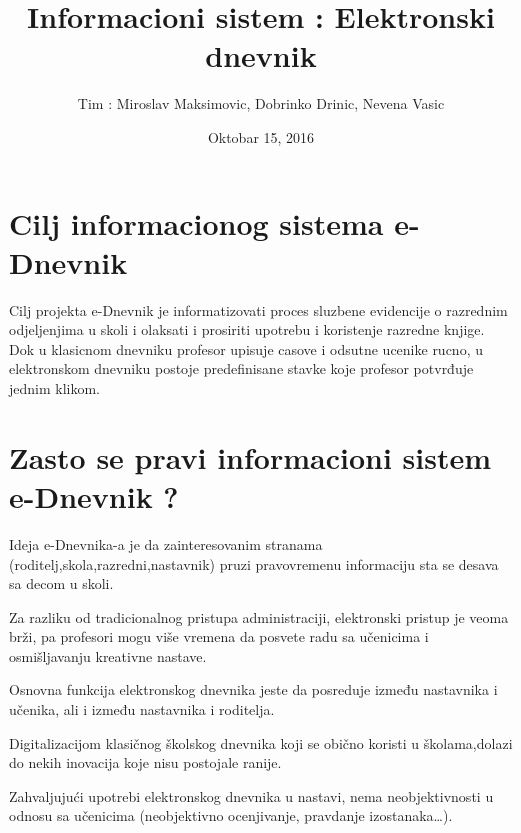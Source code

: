 \documentclass[14pt,a4paper]{book}
\title{\textbf{Informacioni sistem : Elektronski dnevnik}}
\author{Tim : Miroslav Maksimovic, Dobrinko Drinic, Nevena Vasic}
\date{Oktobar 15, 2016 }
\begin{document}
  \maketitle
\section*{Cilj informacionog sistema e-Dnevnik }
 Cilj projekta e-Dnevnik je informatizovati proces sluzbene evidencije o razrednim odjeljenjima u skoli i olaksati i prosiriti upotrebu i koristenje razredne knjige.\newline 
 Dok u klasicnom dnevniku profesor upisuje casove i odsutne ucenike rucno, u elektronskom dnevniku postoje predefinisane stavke koje profesor potvrđuje jednim klikom.

\section*{Zasto se pravi informacioni sistem e-Dnevnik ?  }
Ideja e-Dnevnika-a je da zainteresovanim stranama (roditelj,skola,razredni,nastavnik) pruzi pravovremenu informaciju sta se desava sa decom u skoli. \newline

Za razliku od tradicionalnog pristupa administraciji, elektronski pristup je veoma brži, pa profesori mogu više vremena da posvete radu sa učenicima i osmišljavanju kreativne nastave. \newline

Osnovna funkcija elektronskog dnevnika jeste da posreduje između nastavnika i učenika, ali i između nastavnika i roditelja. \newline

 Digitalizacijom klasičnog školskog dnevnika koji se obično koristi u školama,dolazi do nekih inovacija koje nisu postojale ranije. \newline
 
Zahvaljujući upotrebi elektronskog dnevnika u nastavi, nema neobjektivnosti u odnosu sa učenicima (neobjektivno ocenjivanje, pravdanje izostanaka…).
\end{document}
